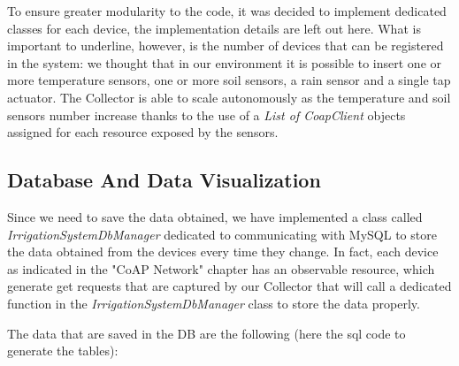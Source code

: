 To ensure greater modularity to the code, it was decided to implement dedicated classes for each device, the implementation details are left out here. What is important to underline, however, is the number of devices that can be registered in the system: we thought that in our environment it is possible to insert one or more temperature sensors, one or more soil sensors, a rain sensor and a single tap actuator. The Collector is able to scale autonomously as the temperature and soil sensors number increase thanks to the use of a \textit{List of CoapClient} objects assigned for each resource exposed by the sensors.


\subsection{Database And Data Visualization}
Since we need to save the data obtained, we have implemented a class called \textit{IrrigationSystemDbManager} dedicated to communicating with MySQL to store the data obtained from the devices every time they change. In fact, each device as indicated in the "CoAP Network" chapter has an observable resource, which generate get requests that are captured by our Collector that will call a dedicated function in the \textit{IrrigationSystemDbManager} class to store the data properly.

The data that are saved in the DB are the following (here the sql code to generate the tables):

